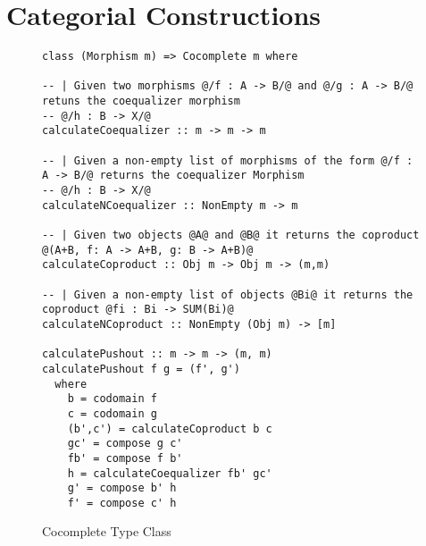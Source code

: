 \section{Categorial Constructions}

\begin{figure}[!ht]
\begin{verbatim}
class (Morphism m) => Cocomplete m where

-- | Given two morphisms @/f : A -> B/@ and @/g : A -> B/@ retuns the coequalizer morphism
-- @/h : B -> X/@
calculateCoequalizer :: m -> m -> m

-- | Given a non-empty list of morphisms of the form @/f : A -> B/@ returns the coequalizer Morphism
-- @/h : B -> X/@
calculateNCoequalizer :: NonEmpty m -> m

-- | Given two objects @A@ and @B@ it returns the coproduct @(A+B, f: A -> A+B, g: B -> A+B)@
calculateCoproduct :: Obj m -> Obj m -> (m,m)

-- | Given a non-empty list of objects @Bi@ it returns the coproduct @fi : Bi -> SUM(Bi)@
calculateNCoproduct :: NonEmpty (Obj m) -> [m]

calculatePushout :: m -> m -> (m, m)
calculatePushout f g = (f', g')
  where
    b = codomain f
    c = codomain g
    (b',c') = calculateCoproduct b c
    gc' = compose g c'
    fb' = compose f b'
    h = calculateCoequalizer fb' gc'
    g' = compose b' h
    f' = compose c' h
\end{verbatim}
\caption{Cocomplete Type Class}
\end{figure}
